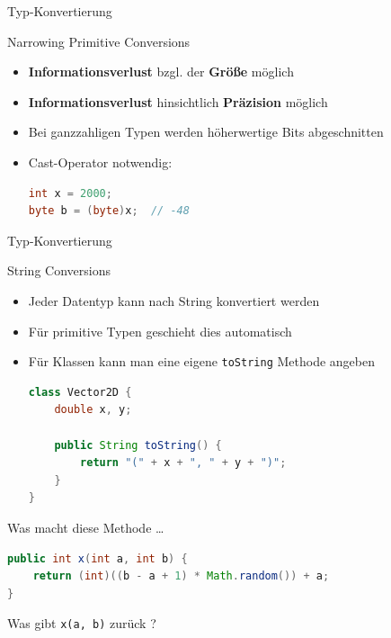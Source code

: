 \documentclass[18pt]{beamer}
\begin{document}
\begin{frame}[fragile]{Typ-Konvertierung}
    \begin{block}{Narrowing Primitive Conversions}
        \begin{itemize}
            \item \alert{\textbf{Informationsverlust}} bzgl. der \alert{\textbf{Größe}} möglich
            \item \alert{\textbf{Informationsverlust}} hinsichtlich \alert{\textbf{Präzision}} möglich
            \item Bei ganzzahligen Typen werden höherwertige Bits abgeschnitten
            \item Cast-Operator notwendig:
            \begin{lstlisting}[language=Java,basicstyle=\scriptsize]
int x = 2000;
byte b = (byte)x;  // -48
            \end{lstlisting}

        \end{itemize}
    \end{block}

\end{frame}

\begin{frame}[fragile]{Typ-Konvertierung}
    \begin{block}{String Conversions}
        \begin{itemize}
            \item Jeder Datentyp kann nach String konvertiert werden
            \item Für primitive Typen geschieht dies automatisch
            \item Für Klassen kann man eine eigene \texttt{toString} Methode angeben
            \begin{lstlisting}[language=Java,basicstyle=\scriptsize]
class Vector2D {
    double x, y;

    public String toString() {
        return "(" + x + ", " + y + ")";
    }
}
            \end{lstlisting}

        \end{itemize}
    \end{block}

\end{frame}

\begin{frame}[fragile]{Was macht diese Methode \dots}
    \begin{lstlisting}[language=Java]
public int x(int a, int b) {
    return (int)((b - a + 1) * Math.random()) + a;
}
    \end{lstlisting}


    \vspace{.5in}
    Was gibt \texttt{x(a, b)} zurück ?

\end{frame}
\end{document}
